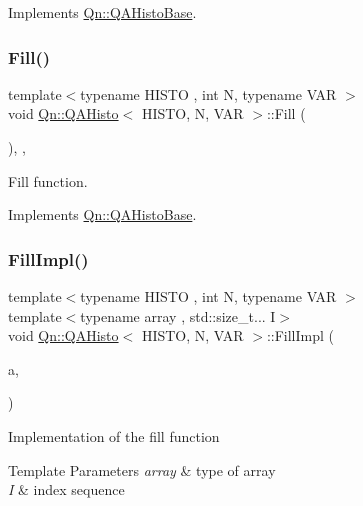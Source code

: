 Implements \mbox{\hyperlink{structQn_1_1QAHistoBase}{Qn\+::\+Q\+A\+Histo\+Base}}.

\mbox{\label{classQn_1_1QAHisto_a0841ac824d99d03b4f2646b62bf9c93e}} 
\subsubsection{\texorpdfstring{Fill()}{Fill()}}
{\footnotesize\ttfamily template$<$typename H\+I\+S\+TO , int N, typename V\+AR $>$ \\
void \mbox{\hyperlink{classQn_1_1QAHisto}{Qn\+::\+Q\+A\+Histo}}$<$ H\+I\+S\+TO, N, V\+AR $>$\+::Fill (\begin{DoxyParamCaption}{ }\end{DoxyParamCaption})\hspace{0.3cm}{\ttfamily [inline]}, {\ttfamily [override]}, {\ttfamily [virtual]}}

Fill function. 

Implements \mbox{\hyperlink{structQn_1_1QAHistoBase}{Qn\+::\+Q\+A\+Histo\+Base}}.

\mbox{\label{classQn_1_1QAHisto_a2cf01f7749c505bdbc14a0895c06d41a}} 
\subsubsection{\texorpdfstring{Fill\+Impl()}{FillImpl()}}
{\footnotesize\ttfamily template$<$typename H\+I\+S\+TO , int N, typename V\+AR $>$ \\
template$<$typename array , std\+::size\+\_\+t... I$>$ \\
void \mbox{\hyperlink{classQn_1_1QAHisto}{Qn\+::\+Q\+A\+Histo}}$<$ H\+I\+S\+TO, N, V\+AR $>$\+::Fill\+Impl (\begin{DoxyParamCaption}\item[{const array}]{a,  }\item[{std\+::index\+\_\+sequence$<$ I... $>$}]{ }\end{DoxyParamCaption})\hspace{0.3cm}{\ttfamily [inline]}}

Implementation of the fill function 
\begin{DoxyTemplParams}{Template Parameters}
{\em array} & type of array \\
\hline
{\em I} & index sequence \\
\hline
\end{DoxyTemplParams}

